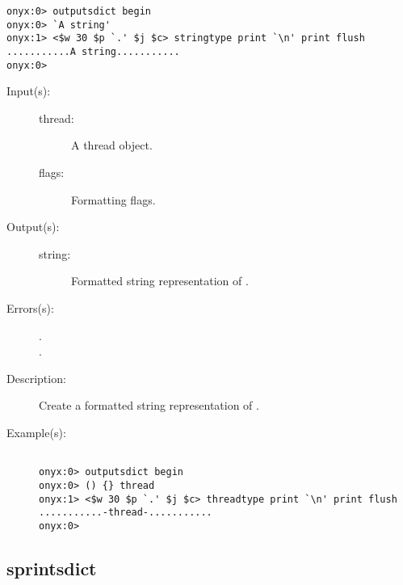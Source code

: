 \begin{description}
\begin{description}
\begin{verbatim}
onyx:0> outputsdict begin
onyx:0> `A string'
onyx:1> <$w 30 $p `.' $j $c> stringtype print `\n' print flush
...........A string...........
onyx:0>
		\end{verbatim}
	\end{description}
\label{outputsdict:threadtype}
\item[{\onyxop{thread flags}{threadtype}{string}}: ]
	\begin{description}\item[]
	\item[Input(s): ]
		\begin{description}\item[]
		\item[thread: ]
			A thread object.
		\item[flags: ]
			Formatting flags.
		\end{description}
	\item[Output(s): ]
		\begin{description}\item[]
		\item[string: ]
			Formatted string representation of .
		\end{description}
	\item[Errors(s): ]
		\begin{description}\item[]
		\item[.]
		\item[.]
		\end{description}
	\item[Description: ]
		Create a formatted string representation of .
	\item[Example(s): ]\begin{verbatim}

onyx:0> outputsdict begin
onyx:0> () {} thread
onyx:1> <$w 30 $p `.' $j $c> threadtype print `\n' print flush
...........-thread-...........
onyx:0>
		\end{verbatim}
	\end{description}
\end{description}

\subsection{sprintsdict}
\label{sec:sprintsdict}

